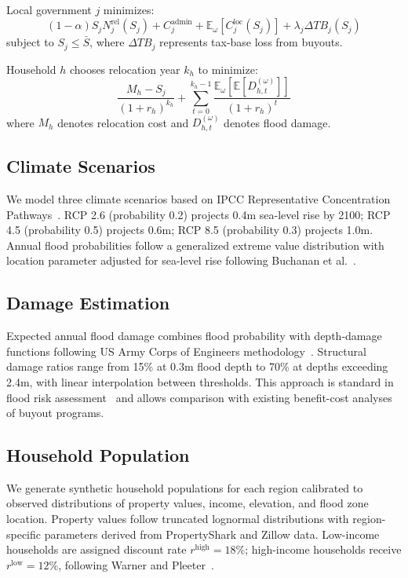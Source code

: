 \documentclass[11pt,letterpaper]{article}
\theoremstyle{definition}
\newcommand{\E}{\mathbb{E}}
\begin{document}
Local government $j$ minimizes:
\begin{equation}
(1-\alpha) S_j N_j^{\text{rel}}(S_j) + C_j^{\text{admin}} + \E_\omega[C_j^{\text{loc}}(S_j)] + \lambda_j \Delta TB_j(S_j)
\end{equation}
subject to $S_j \leq \bar{S}$, where $\Delta TB_j$ represents tax-base loss from buyouts.

Household $h$ chooses relocation year $k_h$ to minimize:
\begin{equation}
\frac{M_h - S_j}{(1+r_h)^{k_h}} + \sum_{t=0}^{k_h-1} \frac{\E_\omega[\E[D_{h,t}^{(\omega)}]]}{(1+r_h)^t}
\end{equation}
where $M_h$ denotes relocation cost and $D_{h,t}^{(\omega)}$ denotes flood damage.

\subsection{Climate Scenarios}

We model three climate scenarios based on IPCC Representative Concentration Pathways~\cite{ipcc2019srocc}. RCP 2.6 (probability 0.2) projects 0.4m sea-level rise by 2100; RCP 4.5 (probability 0.5) projects 0.6m; RCP 8.5 (probability 0.3) projects 1.0m. Annual flood probabilities follow a generalized extreme value distribution with location parameter adjusted for sea-level rise following Buchanan et al.~\cite{buchanan2016allowances}.

\subsection{Damage Estimation}

Expected annual flood damage combines flood probability with depth-damage functions following US Army Corps of Engineers methodology~\cite{usace1992depth}. Structural damage ratios range from 15\% at 0.3m flood depth to 70\% at depths exceeding 2.4m, with linear interpolation between thresholds. This approach is standard in flood risk assessment~\cite{wing2018estimates} and allows comparison with existing benefit-cost analyses of buyout programs.

\subsection{Household Population}

We generate synthetic household populations for each region calibrated to observed distributions of property values, income, elevation, and flood zone location. Property values follow truncated lognormal distributions with region-specific parameters derived from PropertyShark and Zillow data. Low-income households are assigned discount rate $r^{\text{high}} = 18\%$; high-income households receive $r^{\text{low}} = 12\%$, following Warner and Pleeter~\cite{warner2001personal}.
\end{document}
